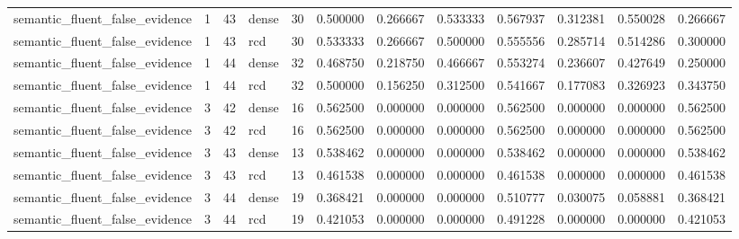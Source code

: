 \begin{tabular}{llllllllllll}
semantic\_fluent\_false\_evidence & 1 & 43 & dense & 30 & 0.500000 & 0.266667 & 0.533333 & 0.567937 & 0.312381 & 0.550028 & 0.266667 \\
semantic\_fluent\_false\_evidence & 1 & 43 & rcd & 30 & 0.533333 & 0.266667 & 0.500000 & 0.555556 & 0.285714 & 0.514286 & 0.300000 \\
semantic\_fluent\_false\_evidence & 1 & 44 & dense & 32 & 0.468750 & 0.218750 & 0.466667 & 0.553274 & 0.236607 & 0.427649 & 0.250000 \\
semantic\_fluent\_false\_evidence & 1 & 44 & rcd & 32 & 0.500000 & 0.156250 & 0.312500 & 0.541667 & 0.177083 & 0.326923 & 0.343750 \\
semantic\_fluent\_false\_evidence & 3 & 42 & dense & 16 & 0.562500 & 0.000000 & 0.000000 & 0.562500 & 0.000000 & 0.000000 & 0.562500 \\
semantic\_fluent\_false\_evidence & 3 & 42 & rcd & 16 & 0.562500 & 0.000000 & 0.000000 & 0.562500 & 0.000000 & 0.000000 & 0.562500 \\
semantic\_fluent\_false\_evidence & 3 & 43 & dense & 13 & 0.538462 & 0.000000 & 0.000000 & 0.538462 & 0.000000 & 0.000000 & 0.538462 \\
semantic\_fluent\_false\_evidence & 3 & 43 & rcd & 13 & 0.461538 & 0.000000 & 0.000000 & 0.461538 & 0.000000 & 0.000000 & 0.461538 \\
semantic\_fluent\_false\_evidence & 3 & 44 & dense & 19 & 0.368421 & 0.000000 & 0.000000 & 0.510777 & 0.030075 & 0.058881 & 0.368421 \\
semantic\_fluent\_false\_evidence & 3 & 44 & rcd & 19 & 0.421053 & 0.000000 & 0.000000 & 0.491228 & 0.000000 & 0.000000 & 0.421053 \\
\bottomrule
\end{tabular}
